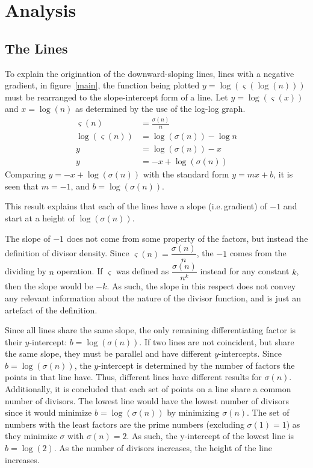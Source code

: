 \documentclass[12pt]{article}
\begin{document}
	\section{Analysis\label{analy}
		}
		\subsection{The Lines}
			To explain the origination of the downward-sloping lines, lines with a negative gradient, in figure~\ref{main}, the function being plotted $y=\log(\varsigma(\log(n)))$ 
			must be rearranged to the slope-intercept form of a line.
			Let $y=\log(\varsigma(x))$ and $x=\log(n)$ as determined by the use of the log-log graph.
			\begin{align*}
				\varsigma(n)&=\frac{\sigma(n)}{n}\\
				\log(\varsigma(n))&=\log(\sigma(n))-\log n\\
				y&=\log(\sigma(n))-x\\
				y&=-x+\log(\sigma(n))
			\end{align*}
			Comparing $y=-x+\log(\sigma(n))$ with the standard form $y=mx+b$, it is seen that $m=-1$, and $b=\log(\sigma(n))$.

			This result explains that each of the lines have a slope (i.e.\,gradient) of $-1$ and start at a height of $\log(\sigma(n))$.

			The slope of $-1$ does not come from some property of the factors, but instead the definition of divisor density. Since $\varsigma(n)=\dfrac{\sigma(n)}{n}$, the $-1$ comes from the dividing by $n$ operation. If $\varsigma$ was defined as $\dfrac{\sigma(n)}{n^k}$ instead for any constant $k$, then the slope would be $-k$. As such, the slope in this respect does not convey any relevant information about the nature of the divisor function, and is just an artefact of the definition.

			Since all lines share the same slope, the only remaining differentiating factor is their $y$-intercept: $b=\log(\sigma(n))$. If two lines are not coincident, but share the same slope, they must be parallel and have different $y$-intercepts. Since $b=\log(\sigma(n))$, the $y$-intercept is determined by the number of factors the points in that line have. Thus, different lines have different results for $\sigma(n)$. Additionally, it is concluded that each set of points on a line share a common number of divisors. The lowest line would have the lowest number of divisors since it would minimize $b=\log(\sigma(n))$ by minimizing $\sigma(n)$. The set of numbers with the least factors are the prime numbers (excluding $\sigma(1)=1$) as they minimize $\sigma$ with $\sigma(n)=2$. As such, the y-intercept of the lowest line is $b=\log(2)$. As the number of divisors increases, the height of the line increases.
\end{document}
